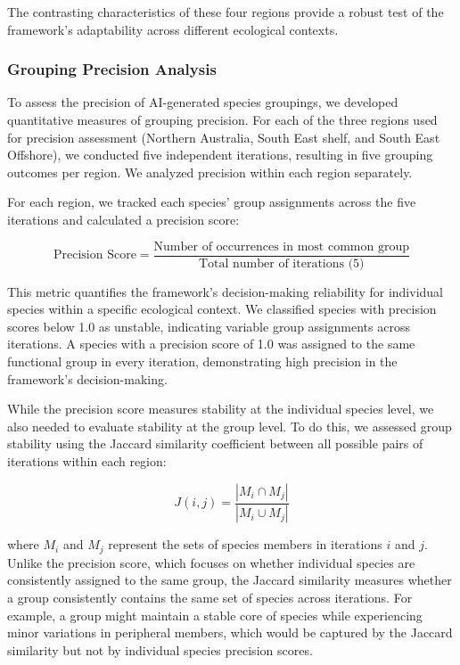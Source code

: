 The contrasting characteristics of these four regions provide a robust test of the framework's adaptability across different ecological contexts.

\subsubsection{Grouping Precision Analysis}

To assess the precision of AI-generated species groupings, we developed quantitative measures of grouping precision. For each of the three regions used for precision assessment (Northern Australia, South East shelf, and South East Offshore), we conducted five independent iterations, resulting in five grouping outcomes per region. We analyzed precision within each region separately.

For each region, we tracked each species' group assignments across the five iterations and calculated a precision score:

\[
\text{Precision Score} = \frac{\text{Number of occurrences in most common group}}{\text{Total number of iterations (5)}}
\]

This metric quantifies the framework's decision-making reliability for individual species within a specific ecological context. We classified species with precision scores below 1.0 as unstable, indicating variable group assignments across iterations. A species with a precision score of 1.0 was assigned to the same functional group in every iteration, demonstrating high precision in the framework's decision-making.

While the precision score measures stability at the individual species level, we also needed to evaluate stability at the group level. To do this, we assessed group stability using the Jaccard similarity coefficient between all possible pairs of iterations within each region:

\[
J(i,j) = \frac{|M_{i} \cap M_{j}|}{|M_{i} \cup M_{j}|}
\]

where $M_{i}$ and $M_{j}$ represent the sets of species members in iterations $i$ and $j$. Unlike the precision score, which focuses on whether individual species are consistently assigned to the same group, the Jaccard similarity measures whether a group consistently contains the same set of species across iterations. For example, a group might maintain a stable core of species while experiencing minor variations in peripheral members, which would be captured by the Jaccard similarity but not by individual species precision scores.

